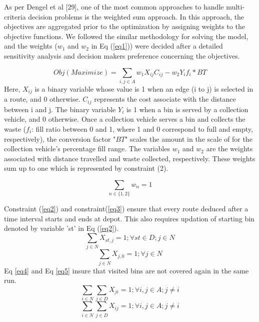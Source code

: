 \documentclass[12pt]{article}
\begin{document}
As per Dengel et al [29], one of the most common approaches to handle multi-criteria decision problems is the weighted sum approach. In this approach, the objectives are aggregated prior to the optimization by assigning weights to the objective functions. We followed the similar methodology for solving the model, and the weights ($w_1$ and $w_2$ in Eq (\ref{eq1}))   were decided after a detailed sensitivity analysis and decision makers preference concerning the objectives. 

\begin{equation}\label{eq1}
    Obj(Maximize)=\sum_{i,j \in A} w_1 X_{ij} C_{ij} - w_2 Y_i f_i * BT
\end{equation}
Here, $X_{ij}$ is a binary variable whose value is 1 when an edge (i to j) is selected in a route, and 0 otherwise. $C_{ij}$ represents the cost associate with the distance between i and j. The binary variable $Y_{i}$ is 1 when a bin is served by a collection vehicle, and 0 otherwise. Once a collection vehicle serves a bin and collects the waste ($f_i$: fill ratio between 0 and 1, where 1 and 0 correspond to full and empty, respectively), the conversion factor "$BT$" scales the amount in the scale of for the collection vehicle's percentage fill range. The variables $w_1$ and $w_2$ are the weights associated with distance travelled and waste collected, respectively. These weights sum up to one which is represented by constraint (2).

\begin{equation}\label{eq1.5}
    \sum_{n\in \{1,2\}} w_n = 1
\end{equation}


Constraint (\ref{eq2}) and constraint(\ref{eq3}) ensure that every route deduced after a time interval starts and ends at depot. This also requires updation of starting bin denoted by variable 'st' in Eq (\ref{eq2}).
\begin{equation}\label{eq2}
    \sum_{j\in N}X_{st,j}=1 ; \forall st \in D ; j \in N
\end{equation}
\begin{equation}\label{eq3}
    \sum_{j\in N}X_{j,0}=1 ; \forall j \in N
\end{equation}
Eq \eqref{eq4} and Eq \eqref{eq5} insure that visited bins are not covered again in the same run.
\begin{equation}\label{eq4}
    \sum_{i\in N}\sum_{j\in D } X_{ji}=1 ; \forall i,j \in A ; j\ne i
\end{equation}
\begin{equation}\label{eq5}
    \sum_{i\in N}\sum_{j\in D } X_{ij}=1 ; \forall i,j \in A ; j\ne i
\end{equation}
\end{document}
